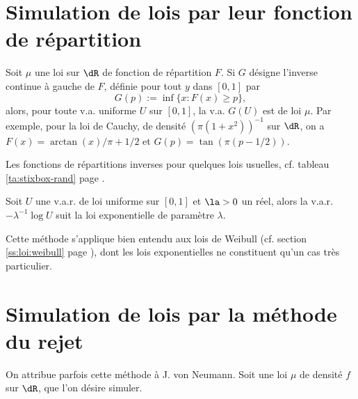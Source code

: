 %
\section{Simulation de lois par leur fonction de répartition}
%

Soit $\mu$ une loi sur $\dR$ de fonction de répartition $F$. Si $G$ désigne
l'inverse continue à gauche de $F$, définie pour tout $y$ dans $[0,1]$ par
$$
G(p):=\inf\{x:F(x)\geq p\},
$$
alors, pour toute v.a. uniforme $U$ sur $[0,1]$, la v.a. $G(U)$ est de loi
$\mu$. Par exemple, pour la loi de Cauchy, de densité $(\pi(1+x^2))^{-1}$ sur
$\dR$, on a $F(x)=\arctan(x)/\pi+1/2$ et $G(p)=\tan(\pi(p-1/2))$. 

Les fonctions de répartitions inverses pour quelques lois usuelles, cf. tableau \ref{ta:stixbox-rand} page
\pageref{ta:stixbox-rand}.

\begin{thm}\label{th:simexp}
  Soit $U$ une v.a.r. de loi uniforme sur $[0,1]$ et $\la>0$ un réel, alors la
  v.a.r. $-\lambda^{-1} \log U$ suit la loi exponentielle de paramètre
  $\lambda$.
\end{thm}
Cette méthode s'applique bien entendu aux lois de Weibull (cf. section
\ref{ss:loi:weibull} page \pageref{ss:loi:weibull}), dont les lois
exponentielles ne constituent qu'un cas très particulier. 


%
\section{Simulation de lois par la méthode du rejet}
%

On attribue parfois cette méthode à J. von Neumann. Soit une loi $\mu$ de
densité $f$ sur $\dR$, que l'on désire simuler.

